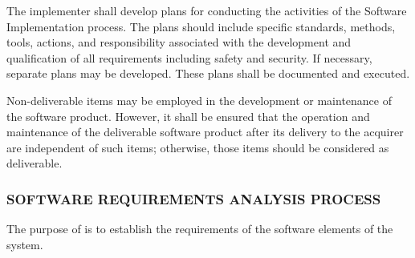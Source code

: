 \begin{adjustwidth}{2em}{0pt}
\begin{compactenum}
\begin{compactenum}
						\item The implementer shall develop plans for conducting the activities of the Software Implementation process. The plans should include specific standards, methods, tools, actions, and responsibility associated with the development and qualification of all requirements including safety and security. If necessary, separate plans may be developed. These plans shall be documented and executed.

						\item Non-deliverable items may be employed in the development or maintenance of the software product. However, it shall be ensured that the operation and maintenance of the deliverable software product after its delivery to the acquirer are independent of such items; otherwise, those items should be considered as deliverable.

					\end{compactenum}

				\end{compactenum}

			\end{adjustwidth}

		\newpage
		\subsubsection{SOFTWARE REQUIREMENTS ANALYSIS PROCESS\label{proc:software_requirements_analysis_process}}

			\begin{adjustwidth}{2em}{0pt} 

				The purpose of  is to establish the requirements of the software elements of the system.

			\end{adjustwidth}

